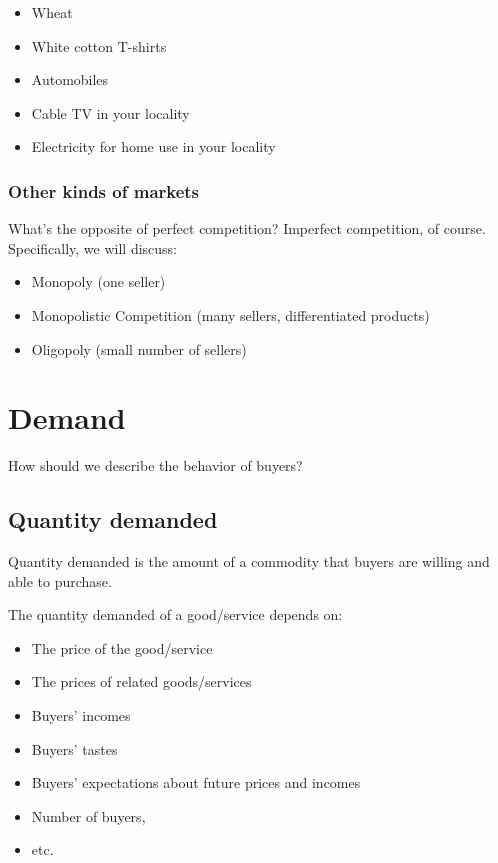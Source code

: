 \documentclass[
  letterpaper,
]{book}
\providecommand{\tightlist}{%
  \setlength{\itemsep}{0pt}\setlength{\parskip}{0pt}}\usepackage{longtable,booktabs,array}
\begin{document}
\begin{itemize}
\tightlist
\item
  Wheat
\item
  White cotton T-shirts
\item
  Automobiles
\item
  Cable TV in your locality
\item
  Electricity for home use in your locality
\end{itemize}

\subsubsection{Other kinds of markets}\label{other-kinds-of-markets}

What's the opposite of perfect competition? Imperfect competition, of
course. Specifically, we will discuss:

\begin{itemize}
\tightlist
\item
  Monopoly (one seller)
\item
  Monopolistic Competition (many sellers, differentiated products)
\item
  Oligopoly (small number of sellers)
\end{itemize}

\section{Demand}\label{demand}

How should we describe the behavior of buyers?

\subsection{Quantity demanded}\label{quantity-demanded}

Quantity demanded is the amount of a commodity that buyers are willing
and able to purchase.

The quantity demanded of a good/service depends on:

\begin{itemize}
\tightlist
\item
  The price of the good/service
\item
  The prices of related goods/services
\item
  Buyers' incomes
\item
  Buyers' tastes
\item
  Buyers' expectations about future prices and incomes
\item
  Number of buyers,
\item
  etc.
\end{itemize}
\end{document}

